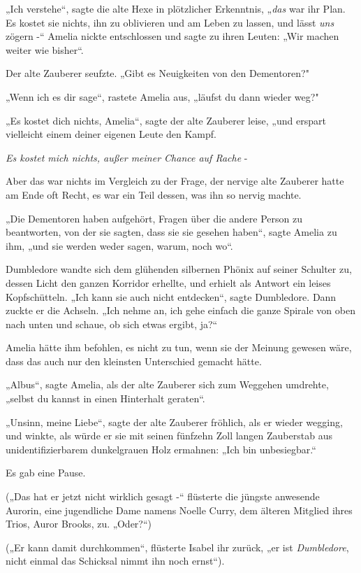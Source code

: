 {„Ich verstehe“, sagte die alte Hexe in plötzlicher Erkenntnis, „\emph{das} war ihr Plan. Es kostet sie nichts, ihn zu oblivieren und am Leben zu lassen, und lässt \emph{uns} zögern -“ Amelia nickte entschlossen und sagte zu ihren Leuten: „Wir machen weiter wie bisher“.

Der alte Zauberer seufzte. „Gibt es Neuigkeiten von den Dementoren?"

„Wenn ich es dir sage“, rastete Amelia aus, „läufst du dann wieder weg?"

„Es kostet dich nichts, Amelia“, sagte der alte Zauberer leise, „und erspart vielleicht einem deiner eigenen Leute den Kampf.

\emph{Es kostet mich nichts, außer meiner Chance auf Rache} -

Aber das war nichts im Vergleich zu der Frage, der nervige alte Zauberer hatte am Ende oft Recht, es war ein Teil dessen, was ihn so nervig machte.

„Die Dementoren haben aufgehört, Fragen über die andere Person zu beantworten, von der sie sagten, dass sie sie gesehen haben“, sagte Amelia zu ihm, „und sie werden weder sagen, warum, noch wo“.

Dumbledore wandte sich dem glühenden silbernen Phönix auf seiner Schulter zu, dessen Licht den ganzen Korridor erhellte, und erhielt als Antwort ein leises Kopfschütteln. „Ich kann sie auch nicht entdecken“, sagte Dumbledore. Dann zuckte er die Achseln. „Ich nehme an, ich gehe einfach die ganze Spirale von oben nach unten und schaue, ob sich etwas ergibt, ja?“

Amelia hätte ihm befohlen, es nicht zu tun, wenn sie der Meinung gewesen wäre, dass das auch nur den kleinsten Unterschied gemacht hätte.

„Albus“, sagte Amelia, als der alte Zauberer sich zum Weggehen umdrehte, „selbst du kannst in einen Hinterhalt geraten“.

„Unsinn, meine Liebe“, sagte der alte Zauberer fröhlich, als er wieder wegging, und winkte, als würde er sie mit seinen fünfzehn Zoll langen Zauberstab aus unidentifizierbarem dunkelgrauen Holz ermahnen: „Ich bin unbesiegbar.“

Es gab eine Pause.

(„Das hat er jetzt nicht wirklich gesagt -“ flüsterte die jüngste anwesende Aurorin, eine jugendliche Dame namens Noelle Curry, dem älteren Mitglied ihres Trios, Auror Brooks, zu. „Oder?“)

(„Er kann damit durchkommen“, flüsterte Isabel ihr zurück, „er ist \emph{Dumbledore}, nicht einmal das Schicksal nimmt ihn noch ernst“).

}
